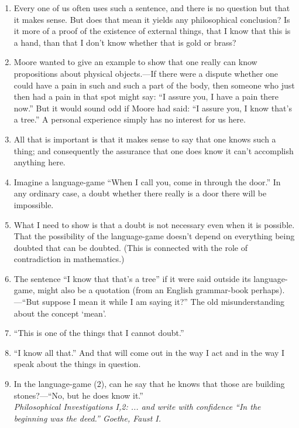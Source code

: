 \documentclass{book}
\begin{document}
\begin{enumerate}
\item
Every one of us often uses such a sentence, and there is no question but that
it makes sense. But does that mean it yields any philosophical conclusion? Is
it more of a proof of the existence of external things, that I know that this
is a hand, than that I don't know whether that is gold or brass?

\item
Moore wanted to give an example to show that one really can know propositions
about physical objects.---If there were a dispute whether one could have a pain
in such and such a part of the body, then someone who just then had a pain in
that spot might say: ``I assure you, I have a pain there now.'' But it would
sound odd if Moore had said: ``I assure you, I know that's a tree.'' A personal
experience simply has no interest for us here.

\item
All that is important is that it makes sense to say that one knows such a
thing; and consequently the assurance that one does know it can't accomplish
anything here.

\item
Imagine a language-game ``When I call you, come in through the door.'' In any
ordinary case, a doubt whether there really is a door there will be impossible.

\item
What I need to show is that a doubt is not necessary even when it is possible.
That the possibility of the language-game doesn't depend on everything being
doubted that can be doubted. (This is connected with the role of contradiction
in mathematics.)

\item
The sentence ``I know that that's a tree'' if it were said outside its
language-game, might also be a quotation (from an English grammar-book
perhaps).---``But suppose I mean it while I am saying it?'' The old
misunderstanding about the concept `mean'.

\item
``This is one of the things that I cannot doubt.''

\item
``I know all that.'' And that will come out in the way I act and in the way I
speak about the things in question.

\item
In the language-game (2), can he say that he knows that those are building
stones?---``No, but he does know it.''
\\
\emph{Philosophical Investigations I,2: ... and write with confidence ``In the
beginning was the deed.'' Goethe, Faust I.}


\end{enumerate}
\end{document}

